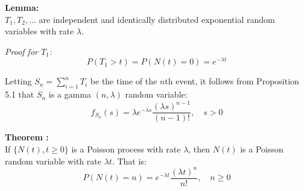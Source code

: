 \textbf{Lemma:} \\
$T_1, T_2, \dots$ are independent and identically distributed exponential random variables with rate $\lambda$.

\textit{Proof for $T_1$:}
\[ P(T_1 > t) = P(N(t) = 0) = e^{-\lambda t} \]

Letting $S_n = \sum_{i=1}^{n} T_i$ be the time of the $n$th event, it follows from Proposition 5.1 that $S_n$ is a gamma $(n, \lambda)$ random variable:
\[ f_{S_n}(s) = \lambda e^{-\lambda s} \frac{(\lambda s)^{n-1}}{(n-1)!}, \quad s > 0 \]

\textbf{Theorem :} \\
If $\{N(t), t \ge 0\}$ is a Poisson process with rate $\lambda$, then $N(t)$ is a Poisson random variable with rate $\lambda t$. That is:
\[ P(N(t) = n) = e^{-\lambda t}\frac{(\lambda t)^n}{n!}, \quad n \ge 0 \]